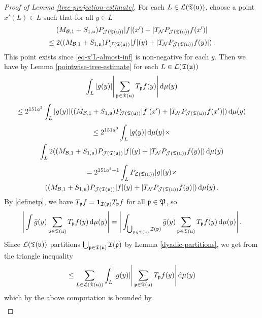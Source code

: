 {\begin{proof}[Proof of Lemma \ref{tree-projection-estimate}]
    For each $L \in \mathcal{L}({\mathfrak T}({\mathfrak u}))$, choose a point $x'(L) \in L$ such that for all $y \in L$
    $$
        (M_{\mathcal{B},1}+S_{1,{\mathfrak u}})P_{\mathcal{J}({\mathfrak T}({\mathfrak u}))}|f|(x')+|T_{\mathcal{N}}P_{\mathcal{J}({\mathfrak T}({\mathfrak u}))}f(x')|
    $$
    \begin{equation}
        \label{eq-x'L-almost-inf}
        \le 2 ((M_{\mathcal{B},1}+S_{1,{\mathfrak u}})P_{\mathcal{J}({\mathfrak T}({\mathfrak u}))}|f|(y)+|T_{\mathcal{N}}P_{\mathcal{J}({\mathfrak T}({\mathfrak u}))}f(y)|)\,.
    \end{equation}
    This point exists since \eqref{eq-x'L-almost-inf} is non-negative for each $y$.
    Then we have by Lemma \ref{pointwise-tree-estimate} for each $L \in \mathcal{L}({\mathfrak T}({\mathfrak u}))$
    $$
        \int_L |g(y)| \Bigg| \sum_{{\mathfrak p} \in {\mathfrak T}({\mathfrak u})} T_{{\mathfrak p}} f(y) \Bigg| \, \mathrm{d}\mu(y)
    $$
    $$
        \le 2^{151a^3} \int_L |g(y)| ((M_{\mathcal{B},1}+S_{1,{\mathfrak u}})P_{\mathcal{J}({\mathfrak T}({\mathfrak u}))}|f|(x')+|T_{\mathcal{N}}P_{\mathcal{J}({\mathfrak T}({\mathfrak u}))}f(x')| ) \, \mathrm{d}\mu(y)
    $$
    \begin{multline*}
        \le 2^{151a^3} \int_L |g(y)| \, \mathrm{d}\mu(y)\times\\
         \int_L 2((M_{\mathcal{B},1}+S_{1,{\mathfrak u}})P_{\mathcal{J}({\mathfrak T}({\mathfrak u}))}|f|(y)+|T_{\mathcal{N}}P_{\mathcal{J}({\mathfrak T}({\mathfrak u}))}f(y)| ) \, \mathrm{d}\mu(y)
    \end{multline*}
    \begin{multline*}
        =  2^{151a^3 + 1} \int_L P_{\mathcal{L}({\mathfrak T}({\mathfrak u}))}|g|(y)\times \\((M_{\mathcal{B},1}+S_{1,{\mathfrak u}})P_{\mathcal{J}({\mathfrak T}({\mathfrak u}))}|f|(y)+|T_{\mathcal{N}}P_{\mathcal{J}({\mathfrak T}({\mathfrak u}))}f(y)| ) \, \mathrm{d}\mu(y)\,.
    \end{multline*}
    By \eqref{definetp}, we have $T_{{\mathfrak p}} f = \mathbf{1}_{{\mathcal{I}}({\mathfrak p})} T_{{\mathfrak p}} f$ for all ${\mathfrak p} \in {\mathfrak P}$, so
    $$
        \Bigg| \int \bar g(y) \sum_{{\mathfrak p} \in {\mathfrak T}({\mathfrak u})} T_{{\mathfrak p}} f(y)  \, \mathrm{d}\mu(y) \Bigg| = \Bigg| \int_{\bigcup_{{\mathfrak p} \in {\mathfrak T}({\mathfrak u})} {\mathcal{I}}({\mathfrak p})} \bar g(y) \sum_{{\mathfrak p} \in {\mathfrak T}({\mathfrak u})} T_{{\mathfrak p}} f(y)  \, \mathrm{d}\mu(y) \Bigg|\,.
    $$
    Since $\mathcal{L}({\mathfrak T}({\mathfrak u}))$ partitions $\bigcup_{{\mathfrak p} \in {\mathfrak T}({\mathfrak u})} {\mathcal{I}}({\mathfrak p})$ by Lemma \ref{dyadic-partitions},
    we get from the triangle inequality
    $$
        \le \sum_{L \in \mathcal{L}({\mathfrak T}({\mathfrak u}))} \int_L |g(y)| \Bigg| \sum_{{\mathfrak p} \in {\mathfrak T}({\mathfrak u})} T_{{\mathfrak p}} f(y) \Bigg| \, \mathrm{d}\mu(y)
    $$
    which by the above computation is bounded by
    \begin{multline*}

\end{multline*}
\end{proof}}
